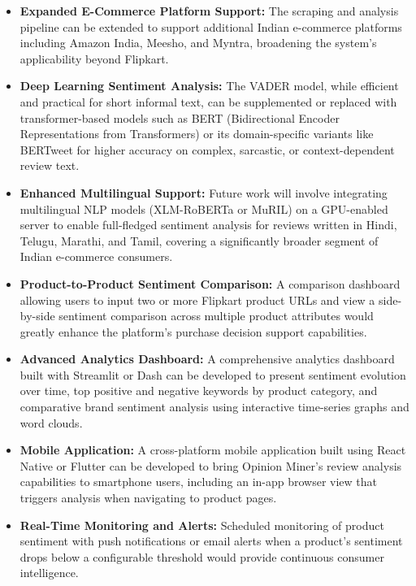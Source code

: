 \documentclass[12pt,a4paper]{report}
\begin{document}
\begin{itemize}
  \item \textbf{Expanded E-Commerce Platform Support:} The scraping and analysis pipeline can be extended to support additional Indian e-commerce platforms including Amazon India, Meesho, and Myntra, broadening the system's applicability beyond Flipkart.

  \item \textbf{Deep Learning Sentiment Analysis:} The VADER model, while efficient and practical for short informal text, can be supplemented or replaced with transformer-based models such as BERT (Bidirectional Encoder Representations from Transformers) or its domain-specific variants like BERTweet for higher accuracy on complex, sarcastic, or context-dependent review text.

  \item \textbf{Enhanced Multilingual Support:} Future work will involve integrating multilingual NLP models (XLM-RoBERTa or MuRIL) on a GPU-enabled server to enable full-fledged sentiment analysis for reviews written in Hindi, Telugu, Marathi, and Tamil, covering a significantly broader segment of Indian e-commerce consumers.

  \item \textbf{Product-to-Product Sentiment Comparison:} A comparison dashboard allowing users to input two or more Flipkart product URLs and view a side-by-side sentiment comparison across multiple product attributes would greatly enhance the platform's purchase decision support capabilities.

  \item \textbf{Advanced Analytics Dashboard:} A comprehensive analytics dashboard built with Streamlit or Dash can be developed to present sentiment evolution over time, top positive and negative keywords by product category, and comparative brand sentiment analysis using interactive time-series graphs and word clouds.

  \item \textbf{Mobile Application:} A cross-platform mobile application built using React Native or Flutter can be developed to bring Opinion Miner's review analysis capabilities to smartphone users, including an in-app browser view that triggers analysis when navigating to product pages.

  \item \textbf{Real-Time Monitoring and Alerts:} Scheduled monitoring of product sentiment with push notifications or email alerts when a product's sentiment drops below a configurable threshold would provide continuous consumer intelligence.


\end{itemize}
\end{document}

